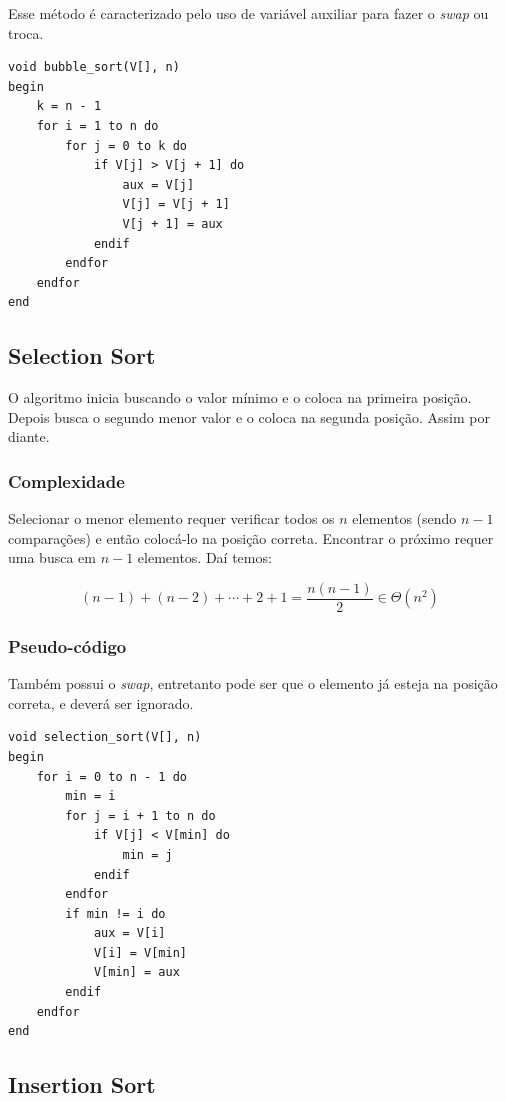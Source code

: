 Esse método é caracterizado pelo uso de variável auxiliar para fazer o
\emph{swap} ou troca.

\begin{verbatim}
void bubble_sort(V[], n)
begin
    k = n - 1
    for i = 1 to n do
        for j = 0 to k do
            if V[j] > V[j + 1] do
                aux = V[j]
                V[j] = V[j + 1]
                V[j + 1] = aux
            endif
        endfor
    endfor
end
\end{verbatim}
\subsection{Selection Sort}

O algoritmo inicia buscando o valor mínimo e o coloca na primeira
posição. Depois busca o segundo menor valor e o coloca na segunda
posição. Assim por diante.

\subsubsection{Complexidade}

Selecionar o menor elemento requer verificar todos os $n$ elementos
(sendo $n - 1$ comparações) e então colocá-lo na posição correta.
Encontrar o próximo requer uma busca em $n - 1$ elementos. Daí temos:

\begin{equation}
(n - 1) + (n - 2) + \cdots + 2 + 1 = \frac{n (n - 1)}{2} \in \Theta(n^2)
\end{equation}

\subsubsection{Pseudo-código}

Também possui o \emph{swap}, entretanto pode ser que o elemento já
esteja na posição correta, e deverá ser ignorado.

\begin{verbatim}
void selection_sort(V[], n)
begin
    for i = 0 to n - 1 do
        min = i
        for j = i + 1 to n do
            if V[j] < V[min] do
                min = j
            endif
        endfor
        if min != i do
            aux = V[i]
            V[i] = V[min]
            V[min] = aux
        endif
    endfor
end
\end{verbatim}
\subsection{Insertion Sort}

